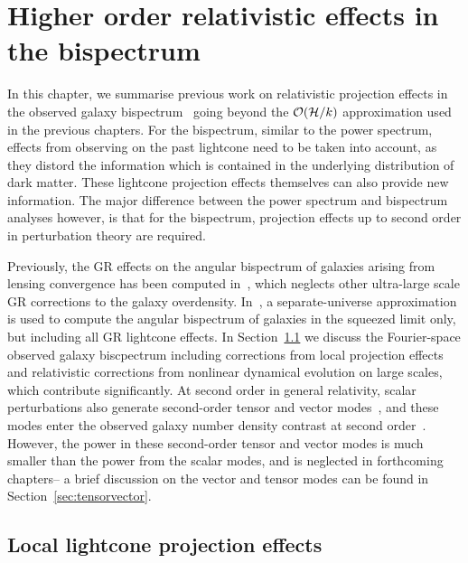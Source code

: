 
\chapter{Higher order relativistic effects in the bispectrum}
\label{chapter:ho}

In this chapter, we summarise previous work on relativistic projection effects in the observed galaxy bispectrum~\cite{Umeh:2016nuh,Jolicoeur:2017nyt,Jolicoeur:2017eyi,Jolicoeur:2018blf} going beyond the $\mathcal{O}(\mathcal{H}/k)$ approximation used in the previous chapters. For the bispectrum, similar to the power spectrum, effects from observing on the past lightcone need to be taken into account, as they distord the information which is contained in the underlying distribution of dark matter. These lightcone projection effects themselves can also provide new information. The major difference between the power spectrum and bispectrum analyses however, is that for the bispectrum, projection effects up to second order in perturbation theory are required. 

Previously, the GR effects on the angular bispectrum of galaxies arising from lensing convergence has been computed in~\cite{DiDio:2015bua}, which neglects other ultra-large scale GR corrections to the galaxy overdensity. In~\cite{Kehagias:2015tda}, a separate-universe approximation is used to compute the angular bispectrum of galaxies in the squeezed limit only, but including all GR lightcone effects. In Section~\ref{sec:localproj} we discuss the Fourier-space observed galaxy biscpectrum including corrections from local projection effects and relativistic corrections from nonlinear dynamical evolution on large scales, which contribute significantly. At second order in general relativity, scalar perturbations also generate second-order tensor and vector modes~\cite{Mollerach:1997up,Matarrese:1997ay}, and these modes enter the observed galaxy number density contrast at second order~\cite{Bertacca:2014hwa,Bertacca:2014wga,Bertacca:2014dra,Yoo:2014sfa,DiDio:2014lka}. However, the power in these second-order tensor and vector modes is much smaller than the power from the scalar modes, and is neglected in forthcoming chapters-- a brief discussion on the vector and tensor modes can be found in Section~\ref{sec:tensorvector}. 


\section{Local lightcone projection effects}\label{sec:localproj}

